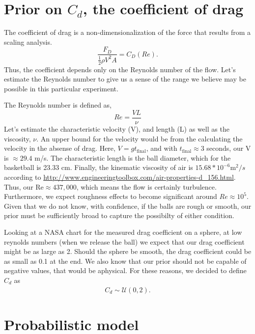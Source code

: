 \documentclass{article}
\begin{document}
\section{Prior on $C_d$, the coefficient of drag}

The coefficient of drag is a non-dimensionalization of the force that
results from a scaling analysis. 
\begin{equation*}
 \frac{F_D}{\frac{1}{2} \rho V^2 A } = C_D(Re).
\end{equation*}
Thus, the coefficient depends only on the Reynolds number of the
flow. Let's estimate the Reynolds number to give us a sense of the range 
we believe may be possible in this particular experiment. 

The Reynolds number is defined as, 
\begin{equation*}
 Re = \frac{V L}{\nu}
\end{equation*}
Let's estimate the characteristic velocity (V), and length (L) as well
as the viscosity, $\nu$. An upper bound for the velocity would be from
the calculating the velocity in the absense of drag. Here, $V = g
t_{\text{final}}$, and with $t_{\text{final}} \approx 3 $ seconds, our V
is $\approx 29.4 $ m/s. The characteristic length is the ball diameter,
which for the basketball is 23.33 cm. Finally, the kinematic viscosity
of air is $15.68 * 10^{-6} \text{m}^2/s$ according to
\url{http://www.engineeringtoolbox.com/air-properties-d_156.html}. Thus,
our $\text{Re} \approx 437,000$, which means the flow is certainly
turbulence. Furthermore, we expect roughness effects to become
significant around $Re \approx 10^5$. Given that we do not know, with
confidence, if the balls are rough or smooth, our prior must be
sufficiently broad to capture the possibilty of either condition. 

Looking at a NASA chart for the measured drag coefficient on a sphere, 
at low reynolds numbers (when we release the ball) we expect that our
drag coefficient might be as large as 2. Should the sphere be smooth,
the drag coefficient could be as small as 0.1 at the end. We also know
that our prior should not be capable of negative values, that would be
aphysical. For these reasons, we decided to define $C_d$ as
\begin{align*}
 C_d \sim \mathcal{U}(0,2).
\end{align*}


\section{Probabilistic model}
\end{document}
